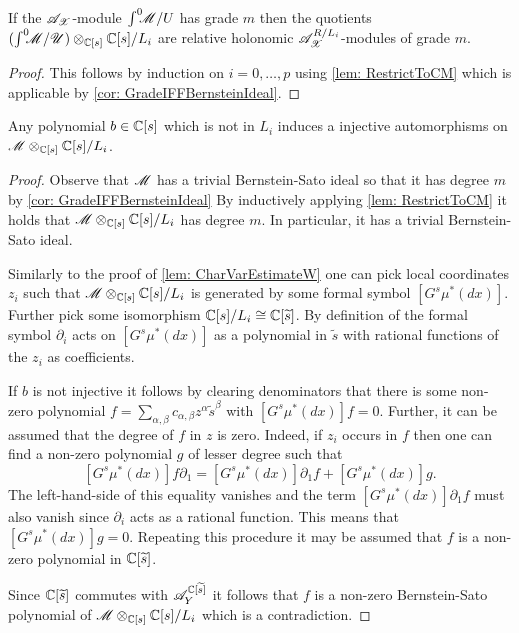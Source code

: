 \begin{lemma}\label{lem: QuotientsRelativeHolonomic}
  If the $\mathscr{A}_{\mathscr{X}}$-module $\int^0 \mkern -8mu\mathscr{M}/U$ has grade $m$ then the quotients $(\int^0 \mkern -8mu\mathscr{M}/\mathscr{U})\otimes_{\mathbb{C}[s]} \mathbb{C}[s]/L_{i}$ are relative holonomic $\mathscr{A}_{\mathscr{X}}^{R/L_i}$-modules of grade $m$.
\end{lemma}
\begin{proof}
  This follows by induction on $i=0,\ldots,p$ using \cref{lem: RestrictToCM} which is applicable by \cref{cor: GradeIFFBernsteinIdeal}.
\end{proof}
\begin{lemma}\label{lem: InjectiveEll}
  Any polynomial $b\in \mathbb{C}[s]$ which is not in $L_i$ induces a injective automorphisms on $\mathscr{M} \otimes_{\mathbb{C}[s]}\mathbb{C}[s]/L_i$.
\end{lemma}
\begin{proof}
  Observe that $\mathscr{M}$ has a trivial Bernstein-Sato ideal so that it has degree $m$ by \cref{cor: GradeIFFBernsteinIdeal}
  By inductively applying \cref{lem: RestrictToCM} it holds that $\mathscr{M} \otimes_{\mathbb{C}[s]}\mathbb{C}[s]/L_i$ has degree $m$.
  In particular, it has a trivial Bernstein-Sato ideal.

  Similarly to the proof of \cref{lem: CharVarEstimateW} one can pick local coordinates $z_i$ such that $\mathscr{M} \otimes_{\mathbb{C}[s]}\mathbb{C}[s]/L_i$ is generated by some formal symbol $[G^s \mu^*(dx)]$.
  Further pick some isomorphism $\mathbb{C}[s]/L_i \cong \mathbb{C}[\widetilde{s}]$.
  By definition of the formal symbol $\partial_i$ acts on $[G^s \mu^*(dx)]$ as a polynomial in $\widetilde{s}$ with rational functions of the $z_i$ as coefficients.

  If $b$ is not injective it follows by clearing denominators that there is some non-zero polynomial $f = \sum_{\alpha,\beta} c_{\alpha,\beta} z^\alpha \widetilde{s}^\beta$ with $[G^s \mu^*(dx)] f = 0$.
  Further, it can be assumed that the degree of $f$ in $z$ is zero.
  Indeed, if $z_i$ occurs in $f$ then one can find a non-zero polynomial $g$ of lesser degree such that
  $$[G^s \mu^*(dx)] f\partial_1 = [G^s \mu^*(dx)]\partial_1 f + [G^s \mu^*(dx)] g.$$
  The left-hand-side of this equality vanishes and the term $[G^s \mu^*(dx)]\partial_1 f$ must also vanish since $\partial_i$ acts as a rational function.
  This means that $[G^s \mu^*(dx)] g = 0$.
  Repeating this procedure it may be assumed that $f$ is a non-zero polynomial in $\mathbb{C}[\widetilde{s}]$.

  Since $\mathbb{C}[\widetilde{s}]$ commutes with $\mathscr{A}_Y^{\mathbb{C}[\widetilde{s}]}$ it follows that $f$ is a non-zero Bernstein-Sato polynomial of $\mathscr{M} \otimes_{\mathbb{C}[s]}\mathbb{C}[s]/L_i$ which is a contradiction.
\end{proof}
